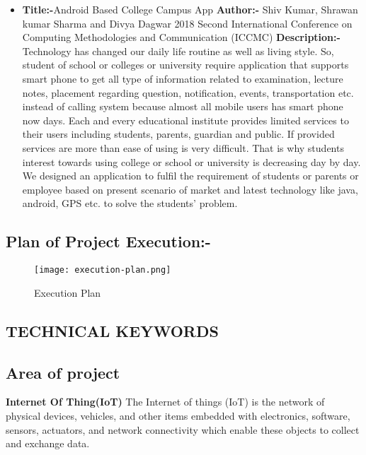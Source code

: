 \documentclass[10pt,a4paper]
{article}
\numberwithin{table}{section}
\begin{document}
{{\begin{normalsize}
\begin{itemize}
\item{\textbf{Title:-}{Android Based College Campus App}\newline
\textbf{Author:-}{ Shiv Kumar, Shrawan kumar Sharma and Divya Dagwar
2018 Second International Conference on Computing Methodologies and Communication (ICCMC)
 } \newline
\textbf{Description:-}{Technology has changed our daily life routine as well as living style. So, student of school or colleges or university require application that supports smart phone to get all type of information related to examination, lecture notes, placement regarding question, notification, events, transportation etc. instead of calling system because almost all mobile users has smart phone now days. Each and every educational institute provides limited services to their users including students, parents, guardian and public. If provided services are more than ease of using is very difficult. That is why students interest towards using college or school or university is decreasing day by day. We designed an application to fulfil the requirement of students or parents or employee based on present scenario of market and latest technology like java, android, GPS etc. to solve the students' problem.}}

\end{itemize}

\newpage
\subsection{Plan of Project Execution:-}
\begin{center}
\begin{figure}[h]
\centering
			\texttt{[image: execution-plan.png]}
				\caption{Execution Plan}
			
		\end{figure}
		\end{center}
\newpage
\begin{center}
\begin{huge}
\section{TECHNICAL KEYWORDS}
\end{huge}
\end{center}

\subsection{Area of project}
\textbf{Internet Of Thing(IoT)}\newline
\hspace*{0.3cm}
{The Internet of things (IoT) is the network of physical devices, vehicles, and other items embedded with electronics, software, sensors, actuators, and network connectivity which enable these objects to collect and exchange data.}

\end{normalsize}}}
\end{document}
